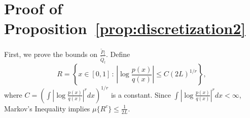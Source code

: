 \documentclass{article}
\newcommand{\bin}{\text{bin}}
\begin{document}
\section{Proof of Proposition~\ref{prop:discretization2}}





First, we prove the bounds on $\frac{\tilde P_l}{\tilde Q_l}$. Define 
$$R = \left \{ x \in [0,1] \,:\, \left| \log \frac{p(x)}{q(x)} \right| \leq C (2L)^{1/r} \right \},$$
where $C = \left( \int \left| \log \frac{p(x)}{q(x)} \right|^r dx \right)^{1/r}$ is a constant. Since $\int \left| \log \frac{p(x)}{q(x)} \right|^r dx < \infty$, Markov's Inequality implies $\mu\{ R^c \} \leq \frac{1}{2L}$.
\end{document}
